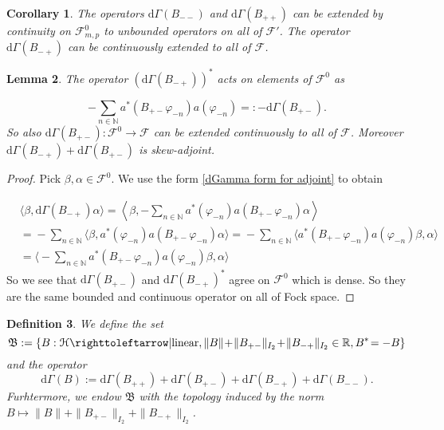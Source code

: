 \documentclass[b5paper,draft,openbib,12pt]{memoir}
\newtheorem{Def}{Definition}
\newtheorem{Lemma}[Def]{Lemma}
\newtheorem{Corollary}[Def]{Corollary}
\begin{document}
\begin{Corollary}
The operators \(\mathrm{d}\Gamma(B_{--})\) and \(\mathrm{d}\Gamma(B_{++})\) can be extended by continuity on \(\mathcal{F}^0_{m,p}\) to unbounded operators on all of \(\mathcal{F}'\).
The operator \(\mathrm{d}\Gamma(B_{-+})\) can be continuously extended to all of \(\mathcal{F}\).
\end{Corollary}

\begin{Lemma}
The operator \(\left(\mathrm{d}\Gamma(B_{-+})\right)^*\)  acts on elements of \(\mathcal{F}^0\) as

\begin{equation}
- \sum_{n\in\mathbb{N}} a^*(B_{+-}\varphi_{-n}) a(\varphi_{-n})=:-\mathrm{d}\Gamma(B_{+-}).
\end{equation}
So also \(\mathrm{d}\Gamma(B_{+-}):\mathcal{F}^0\rightarrow \mathcal{F}\) can be extended continuously to all of \(\mathcal{F}\).
Moreover \(\mathrm{d}\Gamma(B_{-+})+\mathrm{d}\Gamma(B_{+-})\) is skew-adjoint.
\end{Lemma}
\begin{proof}
Pick \(\beta,\alpha \in \mathcal{F}^0\). We use the form 
\eqref{dGamma form for adjoint} to obtain

\begin{align}\nonumber
&\langle \beta, \mathrm{d}\Gamma(B_{-+}) \alpha \rangle=\left\langle \beta, -\sum_{n\in\mathbb{N}} a^*(\varphi_{-n})a(B_{+-}\varphi_{-n}) \alpha \right\rangle\\\nonumber
&=\!-\!\sum_{n\in\mathbb{N}} \langle \beta , a^*(\varphi_{-n})a(B_{+-}\varphi_{-n}) \alpha\rangle
=\!-\!\sum_{n\in\mathbb{N}}  \langle a^*(B_{+-}\varphi_{-n})  a(\varphi_{-n})\beta , \alpha\rangle\\
&=\bigg\langle\!\!-\sum_{n\in\mathbb{N}} a^*(B_{+-}\varphi_{-n})  a(\varphi_{-n})\beta , \alpha\bigg\rangle
\end{align}
 So we see that \(\mathrm{d}\Gamma(B_{+-})\)
and \(\mathrm{d}\Gamma(B_{-+})^*\) agree on \(\mathcal{F}^0\) which is dense. So they are the same bounded and continuous operator on all of
Fock space. 
\end{proof}

\begin{Def}
We define the set 
\begin{equation}
  \mathfrak{B}:=\{B:\mathcal{H}\righttoleftarrow|\mathrm{linear},\|B\|\!+\!\|B_{+-}\|_{I_2}\!+\!\|B_{-+}\|_{I_2}\in\mathbb{R}, {B}^*\!=-B\}
\end{equation}
and the operator
\begin{equation}
  \mathrm{d}\Gamma(B):=\mathrm{d}\Gamma(B_{++})+\mathrm{d}\Gamma(B_{+-})+\mathrm{d}\Gamma(B_{-+})+\mathrm{d}\Gamma(B_{--}).
\end{equation}
Furhtermore, we endow \(\mathfrak{B}\) with the topology induced by 
the norm \(B\mapsto \|B\|+\|B_{+-}\|_{I_2}+\|B_{-+}\|_{I_2}\).
\end{Def}
\end{document}

